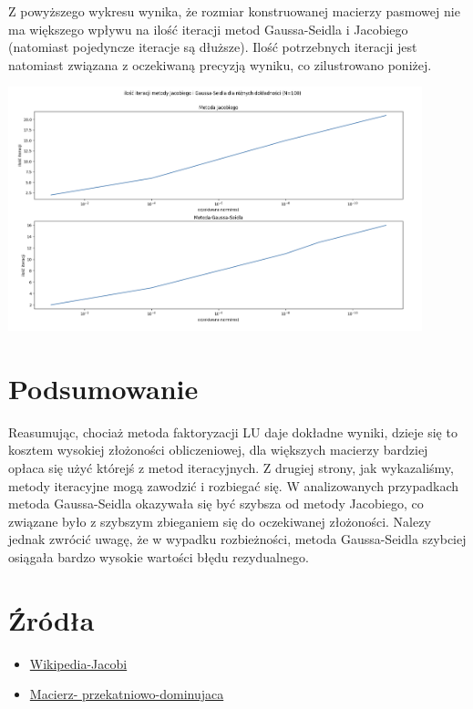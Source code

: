 \documentclass{article}
\begin{document}
Z powyższego wykresu wynika, że rozmiar konstruowanej macierzy pasmowej nie ma większego
wpływu na ilość iteracji metod Gaussa-Seidla i Jacobiego (natomiast pojedyncze iteracje są dłuższe).  Ilość potrzebnych iteracji jest natomiast
związana z oczekiwaną precyzją wyniku, co zilustrowano poniżej.
\begin{center}
	\includegraphics[width=12cm]{z5_oczekiwane_res}
\end{center}

\section{Podsumowanie}
Reasumując, chociaż metoda faktoryzacji LU daje dokładne wyniki, dzieje się to kosztem wysokiej
złożoności obliczeniowej, dla większych macierzy bardziej opłaca się użyć którejś z metod iteracyjnych.
Z drugiej strony, jak wykazaliśmy, metody iteracyjne mogą zawodzić i rozbiegać się.  W analizowanych
przypadkach metoda Gaussa-Seidla okazywała się być szybsza od metody Jacobiego, co związane
było z szybszym zbieganiem się do oczekiwanej złożoności. Nalezy jednak zwrócić uwagę, że w 
wypadku rozbieżności, metoda Gaussa-Seidla szybciej osiągała bardzo wysokie wartości błędu 
rezydualnego.
\section{Źródła}
\begin{itemize}
	\item \href{https://en.wikipedia.org/wiki/Jacobi_method}{Wikipedia-Jacobi}
	\item \href{https://pl.wikipedia.org/wiki/Macierz_przek%C4%85tniowo_dominuj%C4%85ca}{Macierz-
przekatniowo-dominujaca}
\end{itemize}
\end{document}
